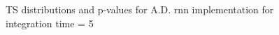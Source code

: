 \begin{figure}
    \centering
    
    
    \caption{TS distributions and p-values for A.D. rnn implementation for integration time = 5}
    \label{fig:ts-distribution-and-p-values-rnn-it-5}
\end{figure}


